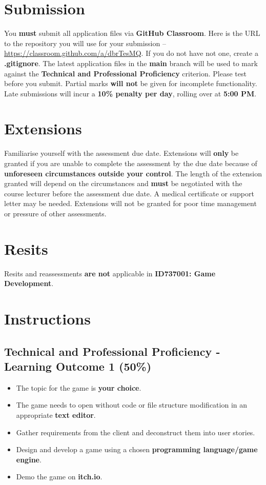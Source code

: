 \documentclass{article}
\begin{document}
\section*{Submission}
You \textbf{must} submit all application files via \textbf{GitHub Classroom}. Here is the URL to the repository you will use for your submission – \href{https://classroom.github.com/a/dbrTesMQ}{https://classroom.github.com/a/dbrTesMQ}. If you do not have not one, create a \textbf{.gitignore}. The latest application files in the \textbf{main} branch will be used to mark against the \textbf{Technical and Professional Proficiency} criterion. Please test before you submit. Partial marks \textbf{will not} be given for incomplete functionality. Late submissions will incur a \textbf{10\% penalty per day}, rolling over at \textbf{5:00 PM}.

\section*{Extensions}
Familiarise yourself with the assessment due date. Extensions will \textbf{only} be granted if you are unable to complete the assessment by the due date because of \textbf{unforeseen circumstances outside your control}. The length of the extension granted will depend on the circumstances and \textbf{must} be negotiated with the course lecturer before the assessment due date. A medical certificate or support letter may be needed. Extensions will not be granted for poor time management or pressure of other assessments.

\section*{Resits}
Resits and reassessments \textbf{are not} applicable in \textbf{ID737001: Game Development}.

\section*{Instructions}

\subsection*{Technical and Professional Proficiency - Learning Outcome 1 (50\%)}
\begin{itemize}
	 \item The topic for the game is \textbf{your choice}.  
	 \item The game needs to open without code or file structure modification in an appropriate \textbf{text editor}.
	 \item Gather requirements from the client and deconstruct them into user stories.
	 \item Design and develop a game using a chosen \textbf{programming language/game engine}.
	 \item Demo the game on \textbf{itch.io}.
\end{itemize}
\end{document}
